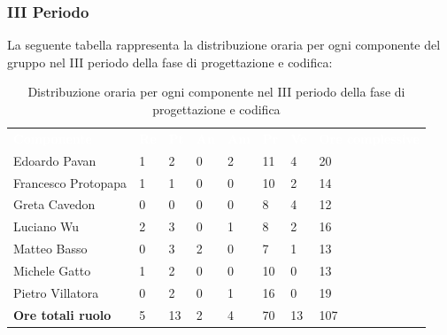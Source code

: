 \subsubsection{III Periodo}
La seguente tabella rappresenta la distribuzione oraria per ogni componente del gruppo nel III periodo della fase di progettazione e codifica:
\begin{table}[!htbp]
\begin{center}
\renewcommand{\arraystretch}{1.25}
\begin{tabular}{ m{}<{\centering}  m{}<{\centering} m{}<{\centering} m{}<{\centering}  m{}<{\centering}  m{}<{\centering}  m{}<{\centering}  m{}<{\centering}   }
	\rowcolor{darkblue}
	\textcolor{white}{\textbf{Componente}} &\textcolor{white}{\textbf{Re}}&\textcolor{white}{\textbf{Pt}}&\textcolor{white}{\textbf{An}}&\textcolor{white}{\textbf{Am}}&\textcolor{white}{\textbf{Pr}}&\textcolor{white}{\textbf{Ve}}&\textcolor{white}{\textbf{Ore complessive}}\\ 
	Edoardo Pavan & 1 & 2 & 0 & 2 & 11 & 4 & 20 \\	
	
	Francesco Protopapa & 1 & 1 & 0 & 0 & 10 & 2 & 14 \\

	Greta Cavedon & 0 & 0 & 0 & 0 & 8 & 4 & 12 \\
	
	Luciano Wu & 2 & 3 & 0 & 1 & 8 & 2 & 16 \\
	
	Matteo Basso & 0 & 3 & 2 & 0 & 7 & 1 & 13 \\
	
	Michele Gatto & 1  & 2 & 0 & 0 & 10 & 0 & 13 \\
	
	Pietro Villatora & 0 & 2 & 0 & 1 & 16 & 0 & 19 \\
	
	\textbf{Ore totali ruolo} & 5 & 13 & 2 & 4 & 70 & 13 & 107 \\

\end{tabular}
\caption{Distribuzione oraria per ogni componente nel III periodo della fase di progettazione e codifica}
\end{center}
\end{table}

